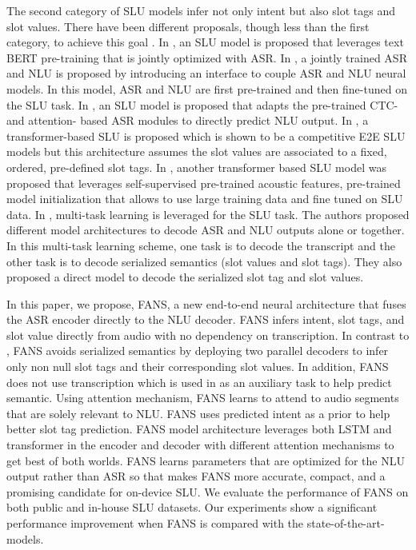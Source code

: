 \documentclass[a4paper]{article}
\begin{document}
The second category of SLU models infer not only intent but also slot tags and slot values. There have been different proposals, though less than the first category, to achieve this goal \cite{lee2015spoken,haghani2018audio,lai2020semisupervised,1910.11559,rao2020speech,martinInterspeech2020,morais2020end,qian2017exploring,chuang2020speechbert} . In  \cite{1910.11559}, an SLU model is proposed that  leverages  text BERT pre-training that is jointly optimized with ASR.   In \cite{rao2020speech}, a jointly trained  ASR and NLU is proposed by introducing an interface to couple ASR and NLU neural models. In this model, ASR and NLU are first pre-trained and then fine-tuned on the SLU task.  In  \cite{kuo2020end}, an SLU model is proposed that adapts the pre-trained CTC- and attention- based ASR modules to directly predict NLU output.
In \cite{martinInterspeech2020}, a transformer-based SLU is proposed  which is shown  to be a competitive E2E SLU models but this architecture  assumes the slot values are associated to a fixed, ordered, pre-defined slot tags. In \cite{morais2020end}, another transformer based SLU model  was proposed that leverages self-supervised pre-trained acoustic features, pre-trained model initialization that allows to use large training data and fine tuned on SLU data.  In \cite{haghani2018audio}, multi-task learning is leveraged for the SLU task. The authors proposed different model architectures to decode  ASR and NLU outputs  alone or together. In this multi-task learning scheme, one task is to decode the transcript and the other task is to decode serialized semantics (slot values and slot tags). They also proposed a direct model to decode the serialized slot tag and slot values.

In this paper, we propose, FANS, a new end-to-end neural  architecture that  fuses  the ASR  encoder directly to  the NLU decoder. FANS infers intent, slot tags, and slot value directly from audio with no dependency on transcription. In contrast to  \cite{haghani2018audio}, FANS avoids serialized semantics by deploying two parallel decoders  to infer only non null slot tags and their corresponding slot values. In addition, FANS does not use transcription which is used in  \cite{haghani2018audio} as an auxiliary task to help predict semantic. Using  attention mechanism, FANS learns to attend to  audio segments that are  solely relevant to NLU. FANS uses predicted intent as a prior to help better slot tag prediction. FANS model architecture leverages both LSTM and transformer in the encoder and decoder with different attention mechanisms to get best of both worlds. FANS learns parameters that are optimized for the NLU output rather than ASR so that makes FANS more accurate, compact, and a promising candidate for on-device SLU. We evaluate the performance of FANS on both public and in-house SLU datasets. Our experiments show a significant performance improvement when FANS is compared with  the state-of-the-art-models. 
\end{document}
